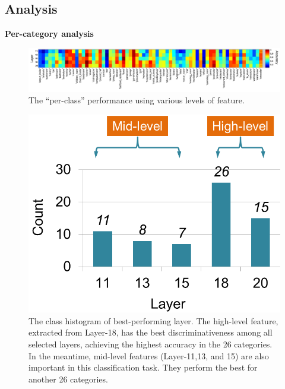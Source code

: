 \documentclass[10pt,twocolumn,letterpaper]{article}
\begin{document}
\subsection{Analysis}

{\bf Per-category analysis}

\begin{figure}[htbp]
\centering
	\includegraphics[width=1\textwidth]{fig/fig_level_perf.png}
\caption{The ``per-class'' performance using various levels of feature.}

\label{fig:level_perf}
\end{figure}

\begin{figure}[htbp]
\centering
	\includegraphics[width=.6\columnwidth]{fig/best_perf_layer_hist.png}
\caption{The class histogram of best-performing layer. The high-level feature, extracted from Layer-18,  has the best discriminativeness among all selected layers, achieving the highest accuracy in the 26 categories. In the meantime, mid-level features (Layer-11,13, and 15) are also important in this classification task. They perform the best for another 26 categories. }

\label{fig:best_perf_layer_hist}
\end{figure}
\end{document}
